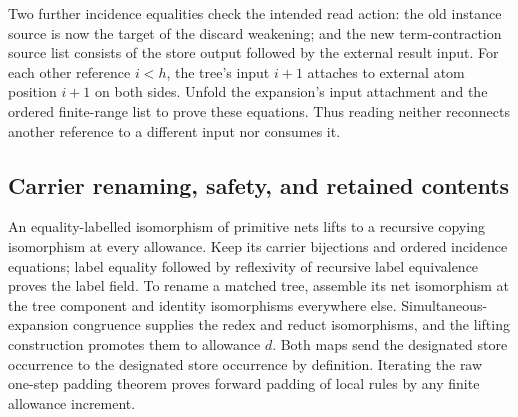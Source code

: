 





Two further incidence equalities check the intended read action: the old
instance source is now the target of the discard weakening; and the new
term-contraction source list consists of the store output followed by the
external result input. For each other reference $i<h$, the tree's input $i+1$
attaches to external atom position $i+1$ on both sides. Unfold the expansion's
input attachment and the ordered finite-range list to prove these equations.
Thus reading neither reconnects another reference to a different input nor
consumes it.





\subsection{Carrier renaming, safety, and retained contents}

An equality-labelled isomorphism of primitive nets lifts to a recursive
copying isomorphism at every allowance. Keep its carrier bijections and ordered
incidence equations; label equality followed by reflexivity of recursive label
equivalence proves the label field. To rename a matched tree, assemble its net
isomorphism at the tree component and identity isomorphisms everywhere else.
Simultaneous-expansion congruence supplies the redex and reduct isomorphisms,
and the lifting construction promotes them to allowance $d$. Both maps send
the designated store occurrence to the designated store occurrence by
definition. Iterating the raw one-step padding theorem proves forward padding
of local rules by any finite allowance increment.

